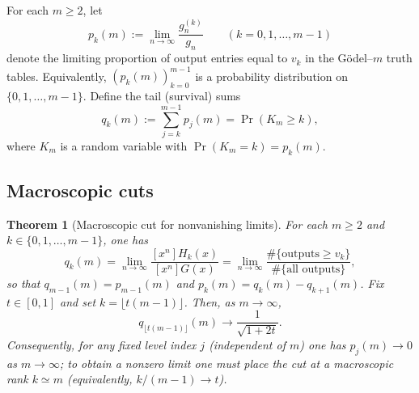 \documentclass[11pt]{article}
\newtheorem{theorem}{Theorem}
\begin{document}
\newpage

\label{sec:limit-law-shape}

For each $m\ge2$, let
\[
p_k(m):=\lim_{n\to\infty}\frac{g_n^{(k)}}{g_n}\qquad (k=0,1,\dots,m-1)
\]
denote the limiting proportion of output entries equal to $v_k$ in the Gödel--$m$ truth tables.
Equivalently, $(p_k(m))_{k=0}^{m-1}$ is a probability distribution on $\{0,1,\dots,m-1\}$.
Define the tail (survival) sums
\[
q_k(m):=\sum_{j=k}^{m-1}p_j(m)=\Pr(K_m\ge k),
\]
where $K_m$ is a random variable with $\Pr(K_m=k)=p_k(m)$.

\subsection{Macroscopic cuts}

\begin{theorem}[Macroscopic cut for nonvanishing limits]\label{thm:macro-cut}
For each $m\ge 2$ and $k\in\{0,1,\dots,m-1\}$, one has
\[
q_k(m)=\lim_{n\to\infty}\frac{[x^n]H_k(x)}{[x^n]G(x)}
=\lim_{n\to\infty}\frac{\#\{\text{outputs}\ge v_k\}}{\#\{\text{all outputs}\}},
\]
so that $q_{m-1}(m)=p_{m-1}(m)$ and $p_k(m)=q_k(m)-q_{k+1}(m)$.
Fix $t\in[0,1]$ and set $k=\lfloor t(m-1)\rfloor$. Then, as $m\to\infty$,
\[
q_{\lfloor t(m-1)\rfloor}(m)\longrightarrow \frac{1}{\sqrt{1+2t}}.
\]
Consequently, for any fixed level index $j$ (independent of $m$) one has $p_j(m)\to 0$ as
$m\to\infty$; to obtain a nonzero limit one must place the cut at a macroscopic rank $k\simeq m$
(equivalently, $k/(m-1)\to t$).

\end{theorem}
\end{document}
